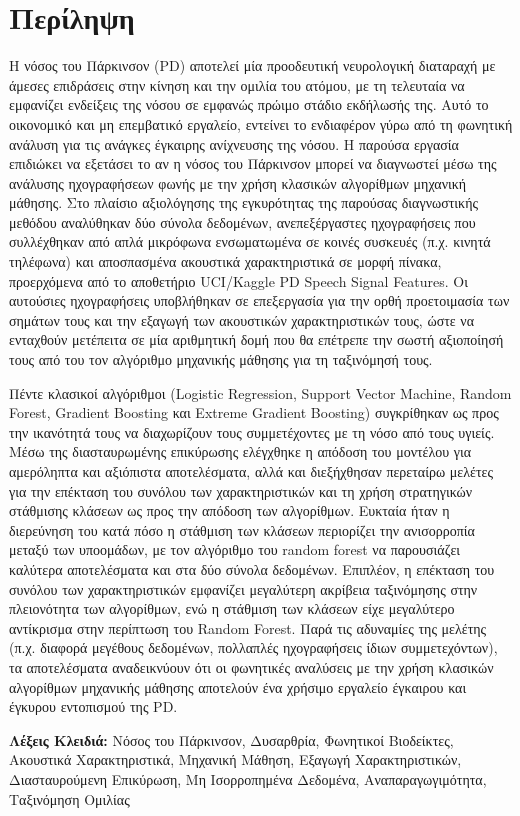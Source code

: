 
\begingroup
{}

\chapter*{Περίληψη}

Η νόσος του Πάρκινσον (PD) αποτελεί μία προοδευτική νευρολογική διαταραχή με άμεσες επιδράσεις στην κίνηση και την ομιλία του ατόμου, με τη τελευταία να εμφανίζει ενδείξεις της νόσου σε εμφανώς πρώιμο στάδιο εκδήλωσής της. 
Αυτό το οικονομικό και μη επεμβατικό εργαλείο, εντείνει το ενδιαφέρον γύρω από τη φωνητική ανάλυση για τις ανάγκες έγκαιρης ανίχνευσης της νόσου. 
Η παρούσα εργασία επιδιώκει να εξετάσει το αν η νόσος του Πάρκινσον μπορεί να διαγνωστεί μέσω της ανάλυσης ηχογραφήσεων φωνής με την χρήση κλασικών αλγορίθμων μηχανική μάθησης. 
Στο πλαίσιο αξιολόγησης της εγκυρότητας της παρούσας διαγνωστικής μεθόδου αναλύθηκαν δύο σύνολα δεδομένων, ανεπεξέργαστες ηχογραφήσεις που συλλέχθηκαν από απλά μικρόφωνα ενσωματωμένα σε κοινές συσκευές (π.χ. κινητά τηλέφωνα) και αποσπασμένα ακουστικά χαρακτηριστικά σε μορφή πίνακα, προερχόμενα από το αποθετήριο UCI/Kaggle PD Speech Signal Features. 
Οι αυτούσιες ηχογραφήσεις υποβλήθηκαν σε επεξεργασία για την ορθή προετοιμασία των σημάτων τους και την εξαγωγή των ακουστικών χαρακτηριστικών τους, ώστε να ενταχθούν μετέπειτα σε μία αριθμητική δομή που θα επέτρεπε την σωστή αξιοποίησή τους από του τον αλγόριθμο μηχανικής μάθησης για τη ταξινόμησή τους. 

Πέντε κλασικοί αλγόριθμοι (Logistic Regression, Support Vector Machine, Random Forest, Gradient Boosting και Extreme Gradient Boosting) συγκρίθηκαν ως προς την ικανότητά τους να διαχωρίζουν τους συμμετέχοντες με τη νόσο από τους υγιείς. 
Μέσω της διασταυρωμένης επικύρωσης ελέγχθηκε η απόδοση του μοντέλου για αμερόληπτα και αξιόπιστα αποτελέσματα, αλλά και διεξήχθησαν περεταίρω μελέτες για την επέκταση του συνόλου των χαρακτηριστικών και τη χρήση στρατηγικών στάθμισης κλάσεων ως προς την απόδοση των αλγορίθμων. 
Ευκταία ήταν η διερεύνηση του κατά πόσο η στάθμιση των κλάσεων περιορίζει την ανισορροπία μεταξύ των υποομάδων, με τον αλγόριθμο του random forest να παρουσιάζει καλύτερα αποτελέσματα και στα δύο σύνολα δεδομένων. 
Επιπλέον, η επέκταση του συνόλου των χαρακτηριστικών εμφανίζει μεγαλύτερη ακρίβεια ταξινόμησης στην πλειονότητα των αλγορίθμων, ενώ η στάθμιση των κλάσεων είχε μεγαλύτερο αντίκρισμα στην περίπτωση του Random Forest. 
Παρά τις αδυναμίες της μελέτης (π.χ. διαφορά μεγέθους δεδομένων, πολλαπλές ηχογραφήσεις ίδιων συμμετεχόντων), τα αποτελέσματα αναδεικνύουν ότι οι φωνητικές αναλύσεις με την χρήση κλασικών αλγορίθμων μηχανικής μάθησης αποτελούν ένα χρήσιμο εργαλείο έγκαιρου και έγκυρου εντοπισμού της PD. 

\vspace{1cm}

\textbf{Λέξεις Κλειδιά:} Νόσος του Πάρκινσον, Δυσαρθρία, Φωνητικοί Βιοδείκτες, Ακουστικά Χαρακτηριστικά, Μηχανική Μάθηση, Εξαγωγή Χαρακτηριστικών, Διασταυρούμενη Επικύρωση, Μη Ισορροπημένα Δεδομένα, Αναπαραγωγιμότητα, Ταξινόμηση Ομιλίας

\endgroup
